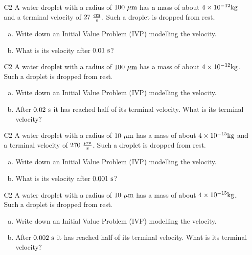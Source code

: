 \begin{problem}{C2}
A water droplet with a radius of \(100\ {\rm \mu m}\) has a mass of about \(4 \times 10^{-12} {\rm kg}\) and a terminal velocity of \(27\ {\rm \frac{cm}{s}}\).  Such a droplet is dropped from rest.  
\begin{enumerate}[(a)]
\item Write down an Initial Value Problem (IVP) modelling the velocity.
\item What is its velocity after \(0.01\ {\rm s}\)?
\end{enumerate}
\end{problem}

\begin{problem}{C2}
A water droplet with a radius of \(100\ {\rm \mu m}\) has a mass of about \(4 \times 10^{-12} {\rm kg}\).  Such a droplet is dropped from rest.  
\begin{enumerate}[(a)]
\item Write down an Initial Value Problem (IVP) modelling the velocity.
\item After \(0.02\ {\rm s}\) it has reached half of its terminal velocity.  What is its terminal velocity?
\end{enumerate}
\end{problem}

\begin{problem}{C2}
A water droplet with a radius of \(10\ {\rm \mu m}\) has a mass of about \(4 \times 10^{-15} {\rm kg}\) and a terminal velocity of \(270 \ {\rm \frac{\mu m}{s}}\).  Such a droplet is dropped from rest.  
\begin{enumerate}[(a)]
\item Write down an Initial Value Problem (IVP) modelling the velocity.
\item What is its velocity after \(0.001\ {\rm s}\)?
\end{enumerate}
\end{problem}

\begin{problem}{C2}
A water droplet with a radius of \(10\ {\rm \mu m}\) has a mass of about \(4 \times 10^{-15} {\rm kg}\).  Such a droplet is dropped from rest.   
\begin{enumerate}[(a)]
\item Write down an Initial Value Problem (IVP) modelling the velocity.
\item After \(0.002\ {\rm s}\) it has reached half of its terminal velocity.  What is its terminal velocity?
\end{enumerate}
\end{problem}

